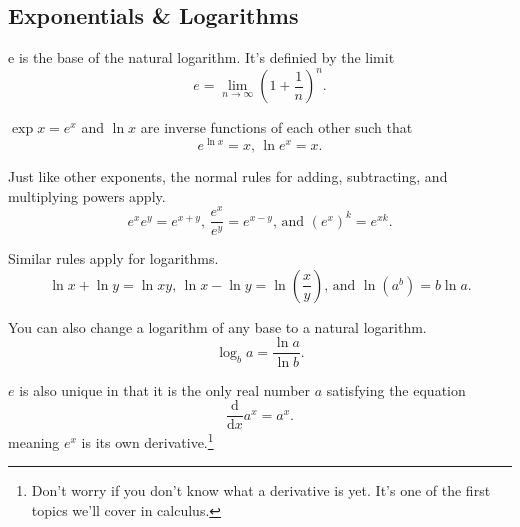 \subsection{Exponentials \& Logarithms}
\begin{definition}
	e is the base of the natural logarithm. It's definied by the limit
	\begin{equation*}
		e = \lim\limits_{n\rightarrow\infty}{\left(1+\frac{1}{n}\right)^n}.
	\end{equation*}
\end{definition}


$\exp{x} = e^x$ and $\ln{x}$ are inverse functions of each other such that
\begin{equation*}
	e^{\ln{x}} = x \text{, } \ln{e^x} = x.
\end{equation*}


Just like other exponents, the normal rules for adding, subtracting, and multiplying powers apply.
\begin{equation*}
	e^xe^y = e^{x+y}\text{, }\frac{e^x}{e^y}=e^{x-y}\text{, and }\left(e^x\right)^k=e^{xk}.
\end{equation*}


Similar rules apply for logarithms.
\begin{equation*}
	\ln{x}+\ln{y} = \ln{xy}\text{, }\ln{x}-\ln{y} = \ln{\left(\frac{x}{y}\right)}\text{, and }\ln{\left(a^b\right)}=b\ln{a}.
\end{equation*}


You can also change a logarithm of any base to a natural logarithm.
\begin{equation*}
	\log_{b}{a} = \frac{\ln{a}}{\ln{b}}.
\end{equation*}


$e$ is also unique in that it is the only real number $a$ satisfying the equation
\begin{equation*}
	\frac{\mathrm{d}}{\mathrm{d}x}a^x = a^x.
\end{equation*}
meaning $e^x$ is its own derivative.\footnote{Don't worry if you don't know what a derivative is yet. It's one of the first topics we'll cover in calculus.}